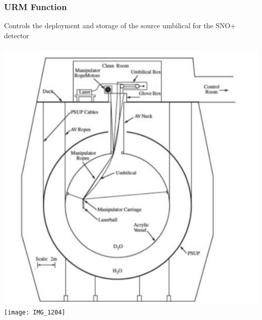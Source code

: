 \documentclass{beamer}
\begin{document}
\begin{frame}
\frametitle{URM Function}
Controls the deployment and storage of the source umbilical for the SNO+ detector\\~\\
\centering\includegraphics[width=0.5\linewidth]{avdia}
\centering\texttt{[image: IMG\_1204]}
\end{frame}

\end{document}
